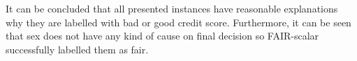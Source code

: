 \documentclass[preprint,12pt]{elsarticle}
\begin{document}
It can be concluded that all presented instances have reasonable explanations why they are labelled with bad or good credit score. Furthermore, it can be seen that sex does not have any kind of cause on final decision so FAIR-scalar successfully labelled them as fair.

\begin{table}
	\centering
	\caption{German credit dataset instances with non zero weights}
\end{table}
\end{document}
